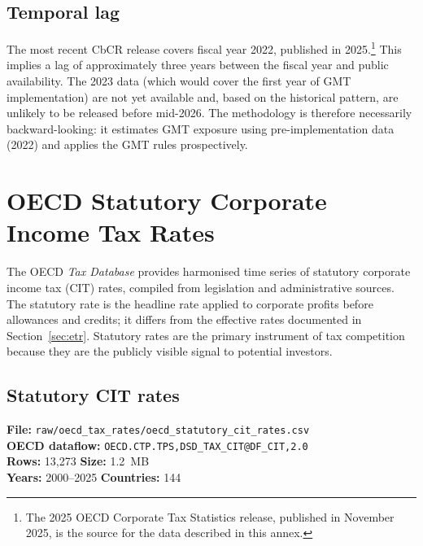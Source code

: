 \documentclass[11pt,a4paper]{article}
\begin{document}
\subsection{Temporal lag}

The most recent CbCR release covers fiscal year 2022, published in
2025.\footnote{The 2025 OECD Corporate Tax Statistics release, published in
November 2025, is the source for the data described in this annex.} This implies a
lag of approximately three years between the fiscal year and public availability.
The 2023 data (which would cover the first year of GMT implementation) are not yet
available and, based on the historical pattern, are unlikely to be released before
mid-2026. The methodology is therefore necessarily backward-looking: it estimates
GMT exposure using pre-implementation data (2022) and applies the GMT rules
prospectively.



\section{OECD Statutory Corporate Income Tax Rates}\label{sec:cit}

The OECD \emph{Tax Database} provides harmonised time series of statutory
corporate income tax (CIT) rates, compiled from legislation and administrative
sources.  The statutory rate is the headline rate applied to corporate profits
before allowances and credits; it differs from the effective rates documented
in Section~\ref{sec:etr}.  Statutory rates are the primary instrument of tax
competition because they are the publicly visible signal to potential investors.

\subsection{Statutory CIT rates}

\textbf{File:} \texttt{raw/oecd\_tax\_rates/oecd\_statutory\_cit\_rates.csv}\\
\textbf{OECD dataflow:} \texttt{OECD.CTP.TPS,DSD\_TAX\_CIT@DF\_CIT,2.0}\\
\textbf{Rows:} 13{,}273 \quad \textbf{Size:} 1.2~MB\\
\textbf{Years:} 2000--2025 \quad \textbf{Countries:} 144
\end{document}

